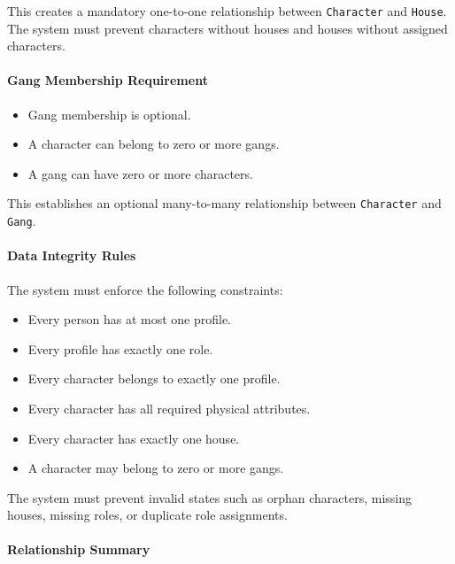 This creates a mandatory one-to-one relationship between
\texttt{Character} and \texttt{House}. The system must prevent
characters without houses and houses without assigned characters.

\hypertarget{gang-membership-requirement}{%
\paragraph{Gang Membership
Requirement}\label{gang-membership-requirement}}

\begin{itemize}
\tightlist
\item
  Gang membership is optional.
\item
  A character can belong to zero or more gangs.
\item
  A gang can have zero or more characters.
\end{itemize}

This establishes an optional many-to-many relationship between
\texttt{Character} and \texttt{Gang}.

\hypertarget{data-integrity-rules}{%
\paragraph{Data Integrity Rules}\label{data-integrity-rules}}

The system must enforce the following constraints:

\begin{itemize}
\tightlist
\item
  Every person has at most one profile.
\item
  Every profile has exactly one role.
\item
  Every character belongs to exactly one profile.
\item
  Every character has all required physical attributes.
\item
  Every character has exactly one house.
\item
  A character may belong to zero or more gangs.
\end{itemize}

The system must prevent invalid states such as orphan characters,
missing houses, missing roles, or duplicate role assignments.

\hypertarget{relationship-summary}{%
\paragraph{Relationship Summary}\label{relationship-summary}}

